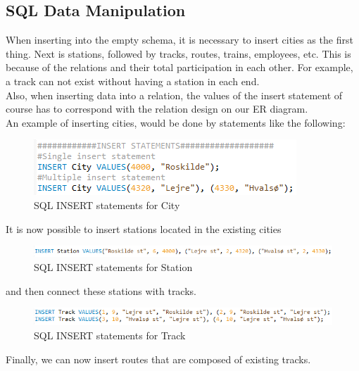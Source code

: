 \newpage
\subsection{SQL Data Manipulation}
When inserting into the empty schema, it is necessary to insert cities as the first thing. Next is stations, followed by tracks, routes, trains, employees, etc. This is because of the relations and their total participation in each other. For example, a track can not exist without having a station in each end.\\
Also, when inserting data into a relation, the values of the insert statement of course has to correspond with the relation design on our ER diagram.\\
An example of inserting cities, would be done by statements like the following:

\begin{figure}[ht!]
    \centering
    \includegraphics[width=.6\textwidth]{img/INSERT_Statements}
    \caption{SQL INSERT statements for City}
    \label{fig:ER}
\end{figure}

It is now possible to insert stations located in the existing cities

\begin{figure}[ht!]
    \centering
    \includegraphics[width=1\textwidth]{img/INSERT_Statement_Station}
    \caption{SQL INSERT statements for Station}
    \label{fig:ER}
\end{figure}

and then connect these stations with tracks.

\begin{figure}[ht!]
    \centering
    \includegraphics[width=1\textwidth]{img/INSERT_Statements_Track}
    \caption{SQL INSERT statements for Track}
    \label{fig:ER}
\end{figure}

Finally, we can now insert routes that are composed of existing tracks.

